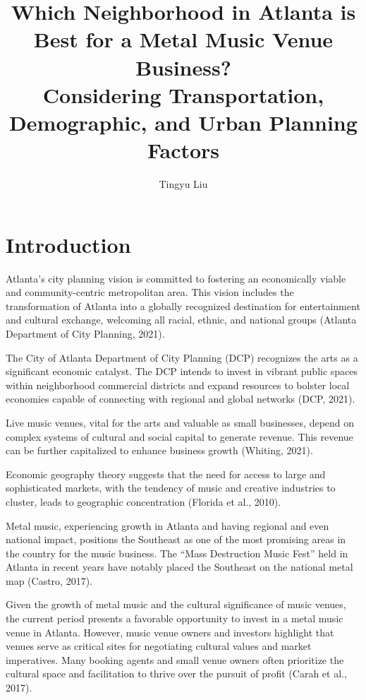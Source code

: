\documentclass[11pt]{article}
\title{Which Neighborhood in Atlanta is Best for a Metal Music Venue Business? \\
Considering Transportation, Demographic, and Urban Planning Factors\\
}
\author{Tingyu Liu}
\begin{document}
    



\section{Introduction}


Atlanta’s city planning vision is committed to fostering an economically viable and community-centric metropolitan area. This vision includes the transformation of Atlanta into a globally recognized destination for entertainment and cultural exchange, welcoming all racial, ethnic, and national groups (Atlanta Department of City Planning, 2021).

The City of Atlanta Department of City Planning (DCP) recognizes the arts as a significant economic catalyst. The DCP intends to invest in vibrant public spaces within neighborhood commercial districts and expand resources to bolster local economies capable of connecting with regional and global networks (DCP, 2021).

Live music venues, vital for the arts and valuable as small businesses, depend on complex systems of cultural and social capital to generate revenue. This revenue can be further capitalized to enhance business growth (Whiting, 2021).

Economic geography theory suggests that the need for access to large and sophisticated markets, with the tendency of music and creative industries to cluster, leads to geographic concentration (Florida et al., 2010).

Metal music, experiencing growth in Atlanta and having regional and even national impact, positions the Southeast as one of the most promising areas in the country for the music business. The “Mass Destruction Music Fest” held in Atlanta in recent years have notably placed the Southeast on the national metal map (Castro, 2017).

Given the growth of metal music and the cultural significance of music venues, the current period presents a favorable opportunity to invest in a metal music venue in Atlanta. However, music venue owners and investors highlight that venues serve as critical sites for negotiating cultural values and market imperatives. Many booking agents and small venue owners often prioritize the cultural space and facilitation to thrive over the pursuit of profit (Carah et al., 2017).
\end{document}
